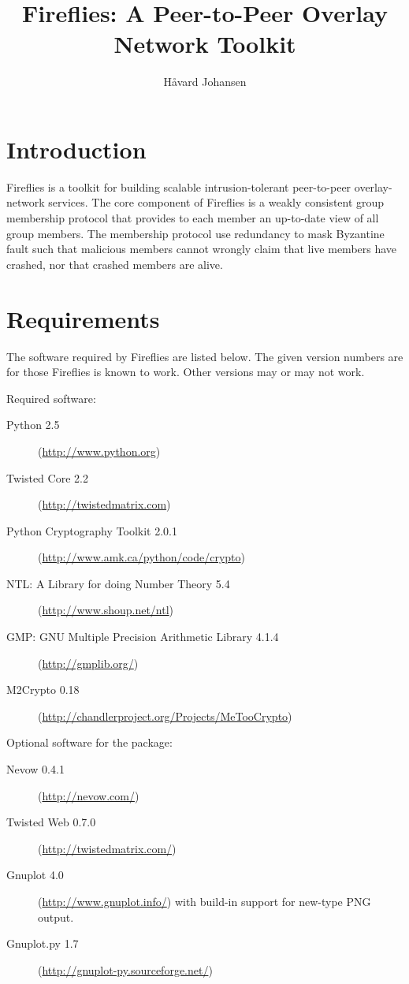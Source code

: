 \documentclass{howto}
\title{Fireflies: A Peer-to-Peer Overlay Network Toolkit}
\author{H\aa vard Johansen}
\begin{document}
\maketitle

\begin{abstract}
\noindent


\end{abstract}

\tableofcontents



\section{Introduction}

Fireflies is a toolkit for building scalable intrusion-tolerant
peer-to-peer overlay-network services. The core component of Fireflies
is a weakly consistent group membership protocol that provides to each
member an up-to-date view of all group members. The membership
protocol use redundancy to mask Byzantine fault such that malicious
members cannot wrongly claim that live members have crashed, nor that
crashed members are alive. 


\section{Requirements}

The software required by Fireflies are listed below. The given version
numbers are for those Fireflies is known to work. Other versions may
or may not work.

Required software:
\begin{description}
\item[Python 2.5] (\url{http://www.python.org})
\item[Twisted Core 2.2] (\url{http://twistedmatrix.com}) 
\item[Python Cryptography Toolkit 2.0.1] (\url{http://www.amk.ca/python/code/crypto})
\item[NTL: A Library for doing Number Theory 5.4] (\url{http://www.shoup.net/ntl})
\item[GMP: GNU Multiple Precision Arithmetic Library 4.1.4] (\url{http://gmplib.org/})
\item[M2Crypto 0.18] (\url{http://chandlerproject.org/Projects/MeTooCrypto})
\end{description}

Optional software for the  package:
\begin{description}
\item[Nevow 0.4.1] (\url{http://nevow.com/})
\item[Twisted Web 0.7.0] (\url{http://twistedmatrix.com/})
\item[Gnuplot 4.0] (\url{http://www.gnuplot.info/}) with build-in support for new-type PNG output. 
\item[Gnuplot.py 1.7] (\url{http://gnuplot-py.sourceforge.net/})
\end{description}
\end{document}
